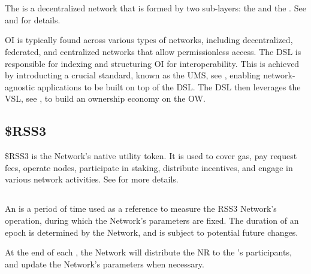 \section{}

The  is a decentralized network that is formed by two sub-layers: the  and the . See  and  for details.

\gls{OI} is typically found across various types of networks, including decentralized, federated, and centralized networks that allow permissionless access.
The \gls{DSL} is responsible for indexing and structuring \gls{OI} for interoperability.
This is achieved by introducting a crucial standard, known as the \gls{UMS}, see , enabling network-agnostic applications to be built on top of the \gls{DSL}.
The \gls{DSL} then leverages the \gls{VSL}, see , to build an ownership economy on the \gls{OW}.

\subsection{\$RSS3}
\$RSS3 is the Network's native utility token. It is used to cover gas, pay request fees, operate nodes, participate in staking, distribute incentives, and engage in various network activities. See  for more details.

\subsection{}

An  is a period of time used as a reference to measure the RSS3 Network’s operation, during which the Network's parameters are fixed.
The duration of an epoch is determined by the Network, and is subject to potential future changes.

At the end of each \epoch, the Network will distribute the \gls{NR} to the 's participants, and update the Network's parameters when necessary.